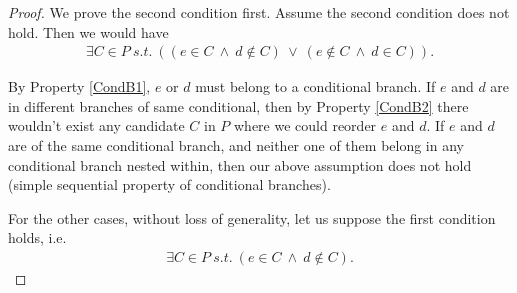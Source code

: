         \begin{proof}

            We prove the second condition first. 
            Assume the second condition does not hold. 
            Then we would have
            \begin{align*}
                \exists C \in P \ s.t. \ 
                (
                    (e \in C \ \wedge \ d \notin C) \ \vee \ 
                    (e \notin C \ \wedge \ d \in C)
                ).
            \end{align*}
            
            By Property \ref{CondB1}, $e$ or $d$ must belong to a conditional branch. 
            If $e$ and $d$ are in different branches of same conditional, then by Property \ref{CondB2} there wouldn't exist any candidate $C$ in $P$ where we could reorder $e$ and $d$. 
            If $e$ and $d$ are of the same conditional branch, and neither one of them belong in any conditional branch nested within, then our above assumption does not hold (simple sequential property of conditional branches).
            
            For the other cases, without loss of generality, let us suppose the first condition holds, i.e. 
            \begin{align*}
                \exists C \in P \ s.t. \ 
                (e \in C \ \wedge \ d \notin C).
            \end{align*}


\end{proof}
